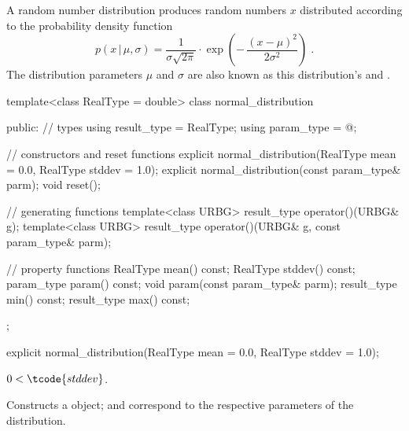 \pnum
A  random number distribution
produces random numbers $x$
distributed according to
the probability density function%
%
%
\[%
 p(x\,|\,\mu,\sigma)
      = \frac{1}{\sigma \sqrt{2\pi}}
        \cdot
        \exp{\left(- \, \frac{(x - \mu)^2}
                             {2 \sigma^2}
             \right)
            }
\; \mbox{.}
\]
The distribution parameters $\mu$ and $\sigma$
are also known as this distribution's %
%
and %
%
%
.

%
\begin{codeblock}
template<class RealType = double>
 class normal_distribution
{
public:
 // types
 using result_type = RealType;
 using param_type  = @\unspec@;

 // constructors and reset functions
 explicit normal_distribution(RealType mean = 0.0, RealType stddev = 1.0);
 explicit normal_distribution(const param_type& parm);
 void reset();

 // generating functions
 template<class URBG>
   result_type operator()(URBG& g);
 template<class URBG>
   result_type operator()(URBG& g, const param_type& parm);

 // property functions
 RealType mean() const;
 RealType stddev() const;
 param_type param() const;
 void param(const param_type& parm);
 result_type min() const;
 result_type max() const;
};
\end{codeblock}


%
\begin{itemdecl}
explicit normal_distribution(RealType mean = 0.0, RealType stddev = 1.0);
\end{itemdecl}

\begin{itemdescr}
\pnum\requires
 $ 0 < \tcode{stddev} $.

\pnum\effects Constructs a  object;
  and 
 correspond to the respective parameters of the distribution.
\end{itemdescr}

